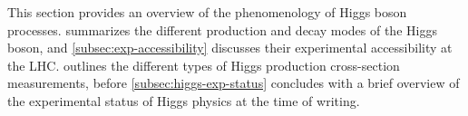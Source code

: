 This section provides an overview of the phenomenology of Higgs boson processes.  summarizes the different production and decay modes of the Higgs boson, and \cref{subsec:exp-accessibility} discusses their experimental accessibility at the LHC.  outlines the different types of Higgs production cross-section measurements, before \cref{subsec:higgs-exp-status} concludes with a brief overview of the experimental status of Higgs physics at the time of writing.





